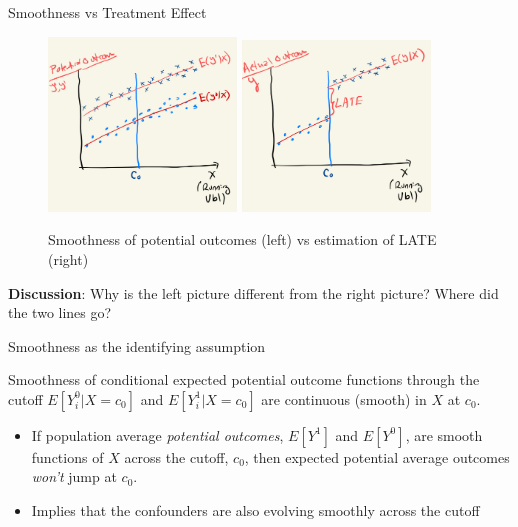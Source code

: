 \documentclass{beamer}
\begin{document}
\begin{frame}{Smoothness vs Treatment Effect}
\begin{figure}
    \centering
    \includegraphics[width=5cm]{./lecture_includes/smoothness.png}
    \qquad
    \includegraphics[width=5cm]{./lecture_includes/LATE_RDD.png}
    \caption{Smoothness of potential outcomes (left) vs estimation of LATE (right)}
\end{figure}

\textbf{Discussion}: Why is the left picture different from the right picture? Where did the two lines go?



\end{frame}




\begin{frame}{Smoothness as the identifying assumption}
	
	\begin{block}{Smoothness of conditional expected potential outcome functions through the cutoff}
	$E[Y_i^0 | X=c_0]$ and $E[Y_i^1 | X=c_0]$ are continuous (smooth) in $X$ at $c_0$. 
	\end{block}
	
	\begin{itemize}
	\item If population average \emph{potential outcomes}, $E[Y^1]$ and $E[Y^0]$, are smooth functions of $X$ across the cutoff, $c_0$, then expected potential average outcomes \emph{won't} jump at $c_0$. 
	\item Implies that the confounders are also evolving smoothly across the cutoff 
	\end{itemize}
	
\end{frame}
\end{document}
